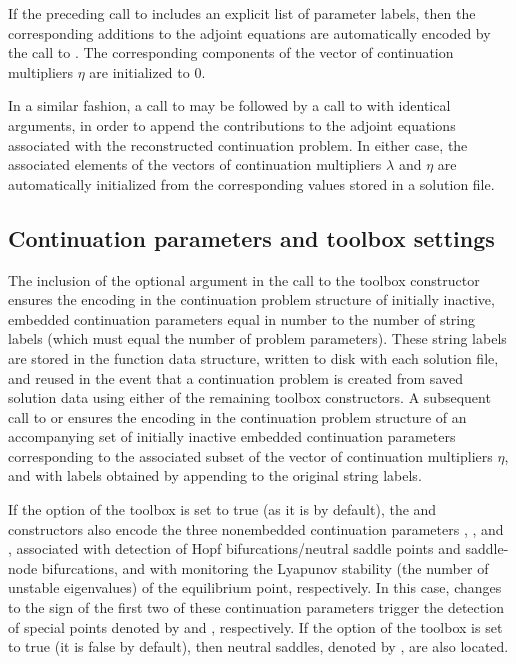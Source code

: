 If the preceding call to  includes an explicit list of parameter labels, then the corresponding additions to the adjoint equations are automatically encoded by the call to . The corresponding components of the vector of continuation multipliers $\eta$ are initialized to $0$.

In a similar fashion, a call to  may be followed by a call to  with identical arguments, in order to append the contributions to the adjoint equations associated with the reconstructed continuation problem. In either case, the associated elements of the vectors of continuation multipliers $\lambda$ and $\eta$ are automatically initialized from the corresponding values stored in a solution file.

\subsection{Continuation parameters and toolbox settings}

The inclusion of the  optional argument in the call to the  toolbox constructor ensures the encoding in the continuation problem structure of initially inactive, embedded continuation parameters equal in number to the number of string labels (which must equal the number of problem parameters). These string labels are stored in the function data structure, written to disk with each solution file, and reused in the event that a continuation problem is created from saved solution data using either of the remaining toolbox constructors. A subsequent call to  or  ensures the encoding in the continuation problem structure of an accompanying set of initially inactive embedded continuation parameters corresponding to the associated subset of the vector of continuation multipliers $\eta$, and with labels obtained by appending  to the original string labels.

If the  option of the  toolbox is set to true (as it is by default), the  and  constructors also encode the three nonembedded continuation parameters , , and , associated with detection of Hopf bifurcations/neutral saddle points and saddle-node bifurcations, and with monitoring the Lyapunov stability (the number of unstable eigenvalues) of the equilibrium point, respectively. In this case, changes to the sign of the first two of these continuation parameters trigger the detection of special points denoted by  and , respectively. If the  option of the  toolbox is set to true (it is false by default), then neutral saddles, denoted by , are also located.

